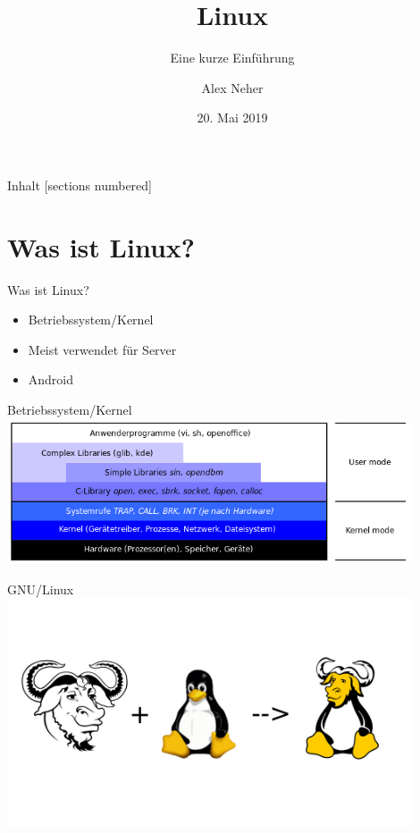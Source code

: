 \documentclass[10pt]{beamer}
\title{Linux}
\subtitle{Eine kurze Einführung}
\date{20. Mai 2019}
\author{Alex Neher}
\begin{document}
\pagestyle{empty}
	
\begin{frame}

\end{frame}

\maketitle

\begin{frame}{Inhalt}
  [sections numbered]
  \tableofcontents[hideallsubsections]
\end{frame}

\section{Was ist Linux?}

\begin{frame}{Was ist Linux?}
    \begin{itemize}[<+- | alert@+>]
        \item Betriebssystem/Kernel
        \item Meist verwendet für Server
        \item Android
    \end{itemize}

\end{frame}

\begin{frame}{Betriebssystem/Kernel}
    \centering
    \includegraphics[keepaspectratio,width=0.9\textwidth]{img/kernel_schichten.png}
\end{frame}

\begin{frame}{GNU/Linux}
    \centering
    \includegraphics[keepaspectratio,width=0.9\textwidth]{img/gnupluslinux.png}
\end{frame}
\end{document}
